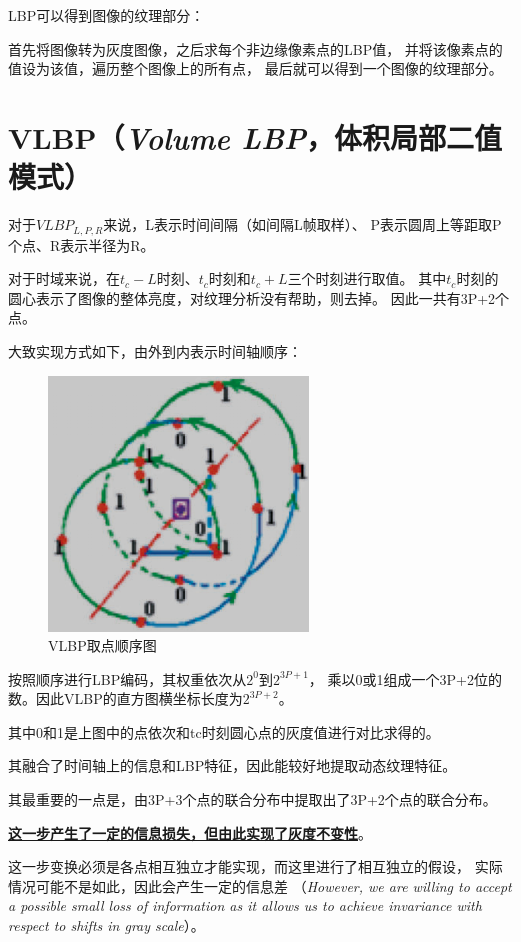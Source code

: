 \documentclass[AutoFakeBold]{MyFormat}
\begin{document}
\par LBP可以得到图像的纹理部分：
\par 首先将图像转为灰度图像，之后求每个非边缘像素点的LBP值，
并将该像素点的值设为该值，遍历整个图像上的所有点，
最后就可以得到一个图像的纹理部分。

\section{VLBP（\textit{Volume LBP}，体积局部二值模式）}
\par 对于$VLBP_{L,P,R}$来说，L表示时间间隔（如间隔L帧取样）、
P表示圆周上等距取P个点、R表示半径为R。
\par 对于时域来说，在$t_c-L$时刻、$t_c$时刻和$t_c+L$三个时刻进行取值。
其中$t_c$时刻的圆心表示了图像的整体亮度，对纹理分析没有帮助，则去掉。
因此一共有3P+2个点。
\par 大致实现方式如下，由外到内表示时间轴顺序：

\begin{figure}[!h]
    \centering
    \includegraphics[width=0.4\linewidth]{figures/2022.05.24/pic11.png}
    \caption{VLBP取点顺序图}
\end{figure}

\par 按照顺序进行LBP编码，其权重依次从$2^0$到$2^{3P+1}$，
乘以0或1组成一个3P+2位的数。因此VLBP的直方图横坐标长度为$2^{3P+2}$。
\par 其中0和1是上图中的点依次和tc时刻圆心点的灰度值进行对比求得的。
\par 其融合了时间轴上的信息和LBP特征，因此能较好地提取动态纹理特征。
\par 其最重要的一点是，由3P+3个点的联合分布中提取出了3P+2个点的联合分布。
\par \textbf{\Large \underline{这一步产生了一定的信息损失，但由此实现了灰度不变性}}。
\par 这一步变换必须是各点相互独立才能实现，而这里进行了相互独立的假设，
实际情况可能不是如此，因此会产生一定的信息差
（\textit {However, we are willing to accept a possible small 
loss of information as it allows us to achieve invariance 
with respect to shifts in gray scale}）。
\end{document}
